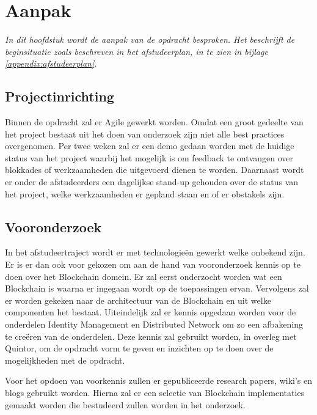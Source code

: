 \chapter{Aanpak}
\label{Aanpak}

\textit{In dit hoofdstuk wordt de aanpak van de opdracht besproken. Het beschrijft de beginsituatie zoals beschreven in het afstudeerplan, in te zien in bijlage \ref{appendix:afstudeerplan}.}



\section{Projectinrichting}

Binnen de opdracht zal er Agile gewerkt worden. Omdat een groot gedeelte van het project bestaat uit het doen van onderzoek zijn niet alle best practices overgenomen. Per twee weken zal er een demo gedaan worden met de huidige status van het project waarbij het mogelijk is om feedback te ontvangen over blokkades of werkzaamheden die uitgevoerd dienen te worden. Daarnaast wordt er onder de afstudeerders een dagelijkse stand-up gehouden over de status van het project, welke werkzaamheden er gepland staan en of er obstakels zijn.

\section{Vooronderzoek} In het afstudeertraject wordt er met technologieën gewerkt welke onbekend zijn. Er is er dan ook voor gekozen om aan de hand van vooronderzoek kennis op te doen over het Blockchain domein. Er zal eerst onderzocht worden wat een Blockchain is waarna er ingegaan wordt op de toepassingen ervan. Vervolgens zal er worden gekeken naar de architectuur van de Blockchain en uit welke componenten het bestaat. Uiteindelijk zal er kennis opgedaan worden voor de onderdelen Identity Management en Distributed Network om zo een afbakening te creëren van de onderdelen. Deze kennis zal gebruikt worden, in overleg met Quintor, om de opdracht vorm te geven en inzichten op te doen over de mogelijkheden met de opdracht. 

Voor het opdoen van voorkennis zullen er gepubliceerde research papers, wiki’s en blogs gebruikt worden. Hierna zal er een selectie van Blockchain implementaties gemaakt worden die bestudeerd zullen worden in het onderzoek.

\newpage
